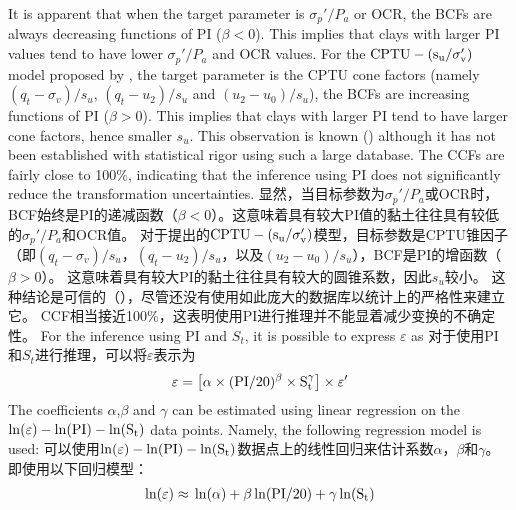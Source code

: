 \begin{Parallel}{0.60\textwidth}{}
{    }
    \ParallelPar
    \ParallelLText
    {
        It is apparent that when the target parameter is $\sigma_p'/P_a$ or OCR, the BCFs are always decreasing functions of PI ($\beta<0$). This implies that clays with larger PI values tend to have lower $\sigma_p'/P_a$ and OCR values. For the $\rm{CPTU}-(s_u/\sigma_v')$ model proposed by \citet{Ching201252}, the target parameter is the CPTU cone factors (namely $(q_t-\sigma_v)/s_u$, $(q_t-u_2)/s_u$ and $(u_2-u_0)/s_u$), the BCFs are increasing functions of PI ($\beta>0$). This implies that clays with larger PI tend to have larger cone factors, hence smaller $s_u$. This observation is known (\citealt{Aas19861,Marsland1988209,Powell1988903}) although it has not been established with statistical rigor using such a large database. The CCFs are fairly close to 100$\%$, indicating that the inference using PI does not significantly reduce the transformation uncertainties.
    }
    \ParallelRText
    {
        显然，当目标参数为$\sigma_p'/P_a$或OCR时，BCF始终是PI的递减函数（$\beta<0$）。这意味着具有较大PI值的黏土往往具有较低的$\sigma_p'/P_a$和OCR值。 对于\citet{Ching201252}提出的$\rm{CPTU}-(s_u/\sigma_v')$模型，目标参数是CPTU锥因子（即$(q_t-\sigma_v)/s_u$，$(q_t-u_2)/s_u$，以及$(u_2-u_0)/s_u$），BCF是PI的增函数（$\beta>0$）。 这意味着具有较大PI的黏土往往具有较大的圆锥系数，因此$s_u$较小。 这种结论是可信的（\citealt{Aas19861,Marsland1988209,Powell1988903}），尽管还没有使用如此庞大的数据库以统计上的严格性来建立它。 CCF相当接近100$\%$，这表明使用PI进行推理并不能显着减少变换的不确定性。
    }
    \ParallelPar
    \ParallelLText
    {
        For the inference using PI and $S_t$, it is possible to express $\varepsilon$ as
    }
    \ParallelRText
    {
        对于使用PI和$S_t$进行推理，可以将$\varepsilon$表示为
    }
    \ParallelPar
    \begin{align}
        \varepsilon=\left[\alpha\times{}(\rm{PI}/20)^\beta\times{}S_t^\gamma\right]\times{}\varepsilon'
        \label{equation:8}
    \end{align}
    \ParallelLText
    {
        The coefficients  $\alpha$,$\beta$ and $\gamma$ can be estimated using linear regression on the $\ln(\varepsilon)-\ln(\rm{PI})-\ln(S_t)$ data points. Namely, the following regression model is used:
    }
    \ParallelRText
    {
        可以使用$\ln(\varepsilon)-\ln(\rm{PI})-\ln(S_t)$数据点上的线性回归来估计系数$\alpha$，$\beta$和$\gamma$。 即使用以下回归模型：
    }
    \ParallelPar
    \begin{align}
        \ln(\varepsilon)\approx{}\ln(\alpha)+\beta\ln(\rm{PI}/20)+\gamma\ln(S_t)

\end{align}
\end{Parallel}
